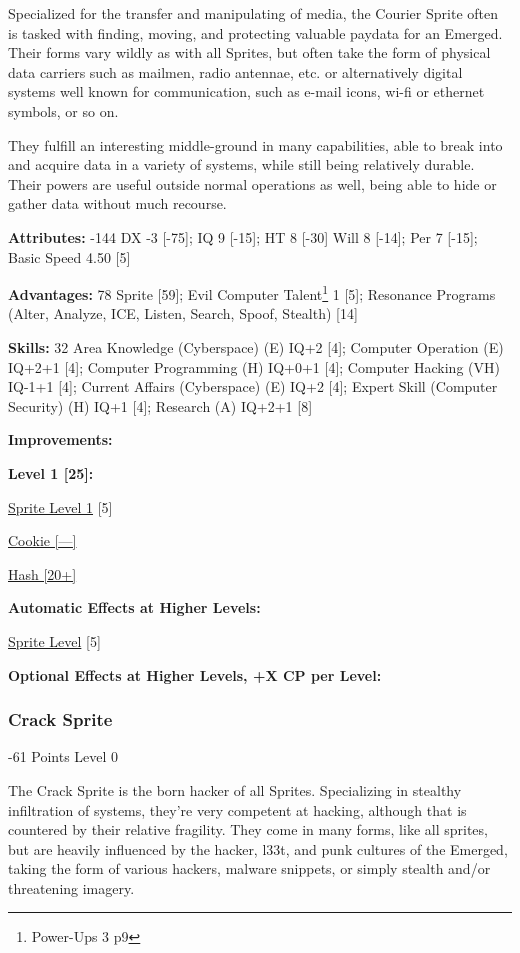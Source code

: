 \begin{multicols*}{3}
Specialized for the transfer and manipulating of media, the Courier Sprite often is tasked with finding, moving, and protecting valuable paydata for an Emerged. Their forms vary wildly as with all Sprites, but often take the form of physical data carriers such as mailmen, radio antennae, etc. or alternatively digital systems well known for communication, such as e-mail icons, wi-fi or ethernet symbols, or so on.

They fulfill an interesting middle-ground in many capabilities, able to break into and acquire data in a variety of systems, while still being relatively durable. Their powers are useful outside normal operations as well, being able to hide or gather data without much recourse.

\textbf{Attributes:} -144
DX -3 [-75]; IQ 9 [-15]; HT 8 [-30]
Will 8 [-14]; Per 7 [-15]; Basic Speed 4.50 [5]

\textbf{Advantages:} 78
Sprite [59]; Evil Computer Talent\footnote{Power-Ups 3 p9} 1 [5]; Resonance Programs (Alter, Analyze, ICE, Listen, Search, Spoof, Stealth) [14]

\textbf{Skills:} 32
Area Knowledge (Cyberspace) (E) IQ+2 [4]; Computer Operation (E) IQ+2+1 [4]; Computer Programming (H) IQ+0+1 [4]; Computer Hacking (VH) IQ-1+1 [4]; Current Affairs (Cyberspace) (E) IQ+2 [4]; Expert Skill (Computer Security) (H) IQ+1 [4]; Research (A) IQ+2+1 [8]

\textbf{ Improvements:}

\textbf{Level 1 [25]:}

\hyperref[sprite_level]{Sprite Level 1} [5]

\hyperref[cookie]{Cookie [—]}

\hyperref[hash]{Hash [20+]}

\textbf{Automatic Effects at Higher Levels:}

\hyperref[sprite_level]{Sprite Level} [5]

\textbf{Optional Effects at Higher Levels, +X CP per Level:}


\subsubsection{Crack Sprite}
\begin{flushright}
	-61 Points Level 0
\end{flushright}

The Crack Sprite is the born hacker of all Sprites. Specializing in stealthy infiltration of systems, they're very competent at hacking, although that is countered by their relative fragility. They come in many forms, like all sprites, but are heavily influenced by the hacker, l33t, and punk cultures of the Emerged, taking the form of various hackers, malware snippets, or simply stealth and/or threatening imagery.


\end{multicols*}
